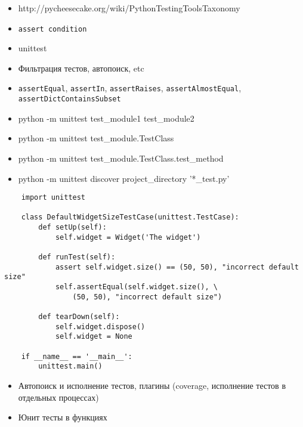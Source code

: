 \documentclass{article}
\begin{document}
\LARGE


\begin{itemize}
\item http://pycheesecake.org/wiki/PythonTestingToolsTaxonomy
\item \lstinline!assert condition!
\item unittest
\item Фильтрация тестов, автопоиск, etc
\item \lstinline!assertEqual!, \lstinline!assertIn!, \lstinline!assertRaises!, 
		\lstinline!assertAlmostEqual!, \lstinline!assertDictContainsSubset!
\item python -m unittest test\_module1 test\_module2
\item python -m unittest test\_module.TestClass
\item python -m unittest test\_module.TestClass.test\_method
\item python -m unittest discover project\_directory '*\_test.py'

\end{itemize}
\newpage

{
\LARGE \vspace{15pt}
\begin{lstlisting}
	import unittest

	class DefaultWidgetSizeTestCase(unittest.TestCase):
	    def setUp(self):
	        self.widget = Widget('The widget')

	    def runTest(self):
	    	assert self.widget.size() == (50, 50), "incorrect default size"
	        self.assertEqual(self.widget.size(), \
	        	(50, 50), "incorrect default size")

	    def tearDown(self):
	        self.widget.dispose()
	        self.widget = None
	
	if __name__ == '__main__':
    	unittest.main()
\end{lstlisting}
}
\newpage


\begin{itemize}
\item Автопоиск и исполнение тестов, плагины 
		(coverage, исполнение тестов в отдельных процессах)
\item Юнит тесты в функциях
\end{itemize}
\end{document}
